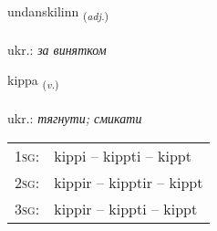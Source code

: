 \documentclass[frontgrid, backgrid]{flacards}\usepackage[]{graphicx}\usepackage[]{xcolor}
\begin{document}
\renewcommand{\flhead}{\vskip5pt \fboxsep=0pt {\small\bfseries\footnotesize Lýsingarorð | прикметник}}
\renewcommand{\fcfoot}{\vskip5pt \fboxsep=0pt \hspace{2pt}{\small\bfseries\footnotesize 3K}}

\renewcommand{\blhead}{\vskip5pt {\small\bfseries\footnotesize Lýsingarorð | прикметник }}
\renewcommand{\bcfoot}{\vskip5pt \hspace{2pt}{\small\bfseries\footnotesize 3K}}


{undanskilinn \small{\textsubscript{(\textit{adj.})}} \\[1ex] %
\textphonetic{[ʏntanscɪlɪn]} \\
ukr.: \emph{за винятком} \\  [2ex]
\renewcommand*{\arraystretch}{0.8}
}

\renewcommand{\flhead}{\vskip5pt \fboxsep=0pt {\small\bfseries\footnotesize Sagnorð | дієслово}}
\renewcommand{\fcfoot}{\vskip5pt \fboxsep=0pt \hspace{2pt}{\small\bfseries\footnotesize 3K}}

\renewcommand{\blhead}{\vskip5pt {\small\bfseries\footnotesize Sagnorð | дієслово }}
\renewcommand{\bcfoot}{\vskip5pt \hspace{2pt}{\small\bfseries\footnotesize 3K}}


{kippa \small{\textsubscript{(\textit{v.})}} \\[1ex] %
\textphonetic{[cʰɪhpa]} \\
ukr.: \emph{тягнути; смикати} \\  [2ex]
\renewcommand*{\arraystretch}{0.8}
\begin{tabular}{p{1cm}l}
\textsc{1sg}: & kippi -- kippti -- kippt \\ 
\textsc{2sg}: & kippir -- kipptir -- kippt \\ 
\textsc{3sg}: & kippir -- kippti -- kippt \\ 
\end{tabular}
}
\end{document}
